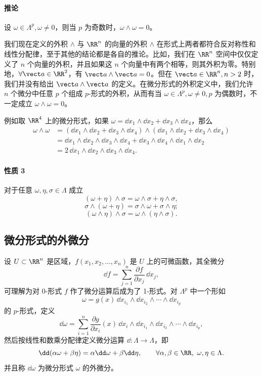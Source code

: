 \paragraph{推论}
设 $\omega\in\Lambda^p,\omega\ne0$，则当 $p$ 为奇数时，$\omega\wedge\omega=0$。

\begin{xremark}
我们现在定义的外积 $\wedge$ 与 $\RR^n$ 的向量的外积 $\wedge$ 在形式上两者都符合反对称性和线性分配律，至于其他的结论都是各自的推论。比如，我们在 $\RR^n$ 空间中仅仅定义了 $n$ 个向量的外积，并且如果这 $n$ 个向量中有两个相等，则其外积为零。特别地，$\forall\vect a\in\RR^2$，有 $\vect a\wedge\vect a=0$。但在 $\vect a\in\RR^n,n>2$ 时，我们并没有给出 $\vect a\wedge\vect a$ 的定义。在微分形式的外积定义中，我们允许 $n$ 个微分中任意 $p$ 个组成 $p$-形式的外积，从而有当 $\omega\in\Lambda^p,\omega\ne0,p$ 为偶数时，不一定成立 $\omega\wedge\omega=0$。

例如取 $\RR^4$ 上的微分形式，如果 $\omega=\dd x_1\wedge\dd x_2+\dd x_3\wedge\dd x_4$，那么
\begin{align*}
\omega\wedge\omega
&=(\dd x_1\wedge\dd x_2+\dd x_3\wedge\dd x_4)\wedge
(\dd x_1\wedge\dd x_2+\dd x_3\wedge\dd x_4)\\
&=\dd x_1\wedge\dd x_2\wedge\dd x_3\wedge\dd x_4
+\dd x_3\wedge\dd x_4\wedge\dd x_1\wedge\dd x_2\\
&=2\,\dd x_1\wedge\dd x_2\wedge\dd x_3\wedge\dd x_4.
\end{align*}
\end{xremark}

\paragraph{性质 3}
对于任意 $\omega,\eta,\sigma\in\Lambda$ 成立
\[
  (\omega+\eta)\wedge\sigma=\omega\wedge\sigma+\eta\wedge\sigma,
\]
\[
  \sigma\wedge(\omega+\eta)=\sigma\wedge\omega+\sigma\wedge\eta;
\]
\[
  (\omega\wedge\eta)\wedge\sigma=\omega\wedge(\eta\wedge\sigma).
\]

\subsection{微分形式的外微分}

设 $U\subset\RR^n$ 是区域，$f(x_1,x_2,\ldots,x_n)$ 是 $U$ 上的可微函数，其全微分
\[
  \dd f=\sum_{j=1}^n\frac{\partial f}{\partial x_j}\,\dd x_j,
\]
可理解为对 0-形式 $f$ 作了微分运算后成为了 1-形式。对 $\Lambda^p$ 中一个形如
\[
  \omega=g(x)\,\dd x_{i_1}\wedge\dd x_{i_2}\wedge\cdots\wedge\dd x_{i_p}
\]
的 $p$-形式，定义
\[
  \dd\omega=\sum_{i=1}^n\frac{\partial g}{\partial x_i}(x)
  \,\dd x_i\wedge\dd x_{i_1}\wedge\dd x_{i_2}\wedge\cdots\wedge\dd x_{i_p},
\]
然后按线性和数乘分配律定义微分运算 $\dd:\Lambda\to\Lambda$，即
\[
  \dd(\alpha\omega+\beta\eta)=\alpha\dd\omega+\beta\dd\eta,
  \qquad\forall\alpha,\beta\in\RR,\ \omega,\eta\in\Lambda.
\]
并且称 $\dd\omega$ 为微分形式 $\omega$ 的外微分。

